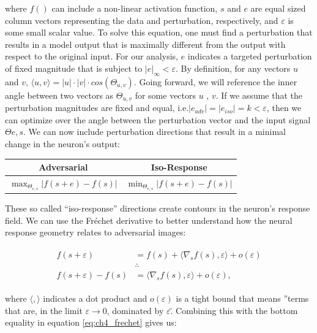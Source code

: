 where $f()$ can include a non-linear activation function, $s$ and $e$ are equal sized column vectors representing the data and perturbation, respectively, and $\varepsilon$ is some small scalar value. To solve this equation, one must find a perturbation that results in a model output that is maximally different from the output with respect to the original input. For our analysis, $e$ indicates a targeted perturbation of fixed magnitude that is subject to $|e|_{\infty}<\varepsilon$. By definition, for any vectors $u$ and $v$, $\langle u,v\rangle = |u| \cdot |v| \cdot cos(\Theta_{u,v})$. Going forward, we will reference the inner angle between two vectors as $\Theta_{u,v}$ for some vectors $u$ , $v$. If we assume that the perturbation magnitudes are fixed and equal, i.e.$|e_{adv}| = |e_{iso}| = k < \varepsilon$, then we can optimize over the angle between the perturbation vector and the input signal $\Theta{e,s}$. We can now include perturbation directions that result in a minimal change in the neuron's output:

\begin{center}
    \begin{tabular}{ |c | c| } \hline
     \textbf{Adversarial} & \textbf{Iso-Response} \\ \hline
     $\max_{\Theta_{e,s}}|f(s+e) - f(s)|$ & $\min_{\Theta_{e,s}} | f(s+e) - f(s) |$ \\ \hline
    \end{tabular}
\end{center}

These so called ``iso-response'' directions create contours in the neuron's response field. We can use the Fr\'{e}chet derivative \parencite{citation} to better understand how the neural response geometry relates to adversarial images:

\begin{align}\label{eq:ch4_frechet}
\begin{split}
    f(s+\varepsilon) &= f(s) + \langle\nabla_{s}f(s), \varepsilon\rangle + o(\varepsilon)\\
    &\therefore \\
    f(s+\varepsilon) - f(s) &= \langle\nabla_{s}f(s), \varepsilon\rangle+ o(\varepsilon),
\end{split}
\end{align}

where $\langle , \rangle$ indicates a dot product and $o(\varepsilon)$ is a tight bound that means ''terms that are, in the limit $\varepsilon \rightarrow 0$, dominated by $\varepsilon$\". Combining this with the bottom equality in equation \ref{eq:ch4_frechet} gives us:

